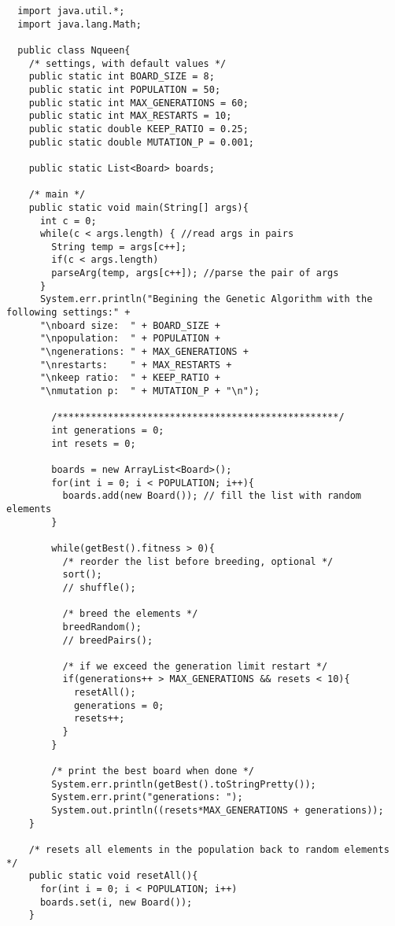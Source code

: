 \documentclass[a4paper,11pt]{article}
\begin{document}
\begin{lstlisting}
  import java.util.*;
  import java.lang.Math;
  
  public class Nqueen{
    /* settings, with default values */
    public static int BOARD_SIZE = 8;
    public static int POPULATION = 50;
    public static int MAX_GENERATIONS = 60;
    public static int MAX_RESTARTS = 10;
    public static double KEEP_RATIO = 0.25;
    public static double MUTATION_P = 0.001;

    public static List<Board> boards;

    /* main */
    public static void main(String[] args){
      int c = 0;
      while(c < args.length) { //read args in pairs
        String temp = args[c++];
        if(c < args.length)
        parseArg(temp, args[c++]); //parse the pair of args
      }
      System.err.println("Begining the Genetic Algorithm with the following settings:" +
      "\nboard size:  " + BOARD_SIZE +
      "\npopulation:  " + POPULATION +
      "\ngenerations: " + MAX_GENERATIONS +
      "\nrestarts:    " + MAX_RESTARTS +
      "\nkeep ratio:  " + KEEP_RATIO +
      "\nmutation p:  " + MUTATION_P + "\n");        

        /**************************************************/
        int generations = 0;
        int resets = 0;
        
        boards = new ArrayList<Board>();
        for(int i = 0; i < POPULATION; i++){
          boards.add(new Board()); // fill the list with random elements
        }
        
        while(getBest().fitness > 0){
          /* reorder the list before breeding, optional */
          sort();
          // shuffle();

          /* breed the elements */
          breedRandom();
          // breedPairs();

          /* if we exceed the generation limit restart */
          if(generations++ > MAX_GENERATIONS && resets < 10){ 
            resetAll();
            generations = 0;
            resets++;
          }
        }

        /* print the best board when done */
        System.err.println(getBest().toStringPretty());
        System.err.print("generations: ");
        System.out.println((resets*MAX_GENERATIONS + generations));
    }

    /* resets all elements in the population back to random elements */
    public static void resetAll(){
      for(int i = 0; i < POPULATION; i++)
      boards.set(i, new Board());
    }


\end{lstlisting}
\end{document}
